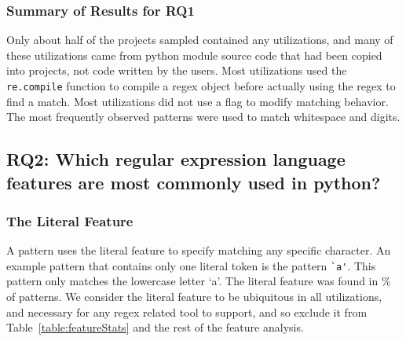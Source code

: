 





% 


\subsubsection{Summary of Results for RQ1}
Only about half of the projects sampled contained any utilizations, and many of these utilizations came from python module source code that had been copied into projects, not code written by the users.  Most utilizations used the {\tt re.compile} function to compile a regex object before actually using the regex to find a match.  Most utilizations did not use a flag to modify matching behavior.  The most frequently observed patterns were used to match whitespace and digits.

\subsection{RQ2: Which regular expression language features are most commonly used in python?}
\label{results:re2}
\subsubsection{The Literal Feature}
A pattern uses the literal feature to specify matching any specific character.  An example pattern that contains only one literal token is the pattern \verb!`a'!.  This pattern only matches the lowercase letter `a'.  The literal feature was found in \% of patterns.
We consider the literal feature to be ubiquitous in all utilizations, and necessary for any regex related tool to support, and so exclude it from Table~\ref{table:featureStats} and the rest of the feature analysis.

